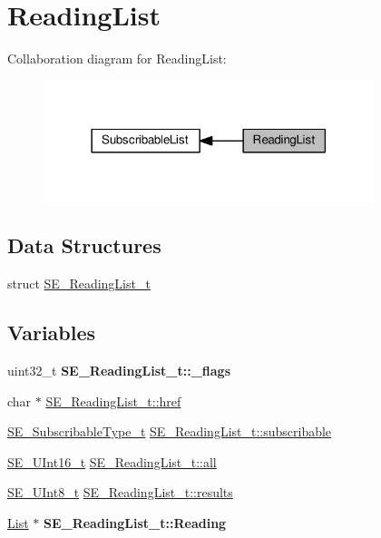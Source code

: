 \hypertarget{group__ReadingList}{}\section{Reading\+List}
\label{group__ReadingList}
Collaboration diagram for Reading\+List\+:\nopagebreak
\begin{figure}[H]
\begin{center}
\leavevmode
\includegraphics[width=273pt]{group__ReadingList}
\end{center}
\end{figure}
\subsection*{Data Structures}
\begin{DoxyCompactItemize}
\item 
struct \hyperlink{structSE__ReadingList__t}{S\+E\+\_\+\+Reading\+List\+\_\+t}
\end{DoxyCompactItemize}
\subsection*{Variables}
\begin{DoxyCompactItemize}
\item 
\mbox{\label{group__ReadingList_ga7b0935ce5920102a5ed6558950ac21ad}} 
uint32\+\_\+t {\bfseries S\+E\+\_\+\+Reading\+List\+\_\+t\+::\+\_\+flags}
\item 
char $\ast$ \hyperlink{group__ReadingList_gafacf2687a03d5902e11e06224e91c913}{S\+E\+\_\+\+Reading\+List\+\_\+t\+::href}
\item 
\hyperlink{group__SubscribableType_ga5c41f553d369710ed34619266bf2551e}{S\+E\+\_\+\+Subscribable\+Type\+\_\+t} \hyperlink{group__ReadingList_ga54934e5a4ccf3fcbd4c0ce1cdf10ae39}{S\+E\+\_\+\+Reading\+List\+\_\+t\+::subscribable}
\item 
\hyperlink{group__UInt16_gac68d541f189538bfd30cfaa712d20d29}{S\+E\+\_\+\+U\+Int16\+\_\+t} \hyperlink{group__ReadingList_ga286e4a2b165954ebcbb3d051b2a2943d}{S\+E\+\_\+\+Reading\+List\+\_\+t\+::all}
\item 
\hyperlink{group__UInt8_gaf7c365a1acfe204e3a67c16ed44572f5}{S\+E\+\_\+\+U\+Int8\+\_\+t} \hyperlink{group__ReadingList_ga8729b48b25f26873984e4198c0fc2cbf}{S\+E\+\_\+\+Reading\+List\+\_\+t\+::results}
\item 
\mbox{\label{group__ReadingList_ga56ffb74cf2349986738c596255cbacf4}} 
\hyperlink{structList}{List} $\ast$ {\bfseries S\+E\+\_\+\+Reading\+List\+\_\+t\+::\+Reading}
\end{DoxyCompactItemize}


